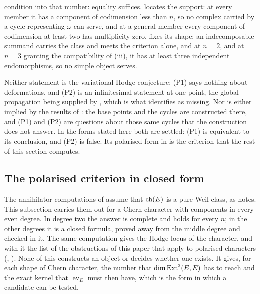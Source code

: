 \begin{remark}
\begin{enumerate}[label=\textup{(P\arabic*)},leftmargin=*]
  condition into that number: equality suffices.  locates
  the support: at every member it has a component of codimension less than
  $n$, so no complex carried by a cycle representing $\omega$ can serve, and
  at a general member every component of codimension at least two has
  multiplicity zero.
   fixes its shape: an indecomposable summand carries the
  class and meets the criterion alone, and at $n=2$, and at $n=3$ granting
  the compatibility of (iii), it has at least three
  independent endomorphisms, so no simple object serves.
\end{enumerate}

Neither statement is the variational Hodge conjecture: (P1) says nothing
about deformations, and (P2) is an infinitesimal statement at one point, the
global propagation being supplied by , which is what
 identifies as missing. Nor is either implied by the
results of : the base points and the cycles are
constructed there, and (P1) and (P2) are questions about those same cycles
that the construction does not answer. In the forms stated here both are
settled: (P1) is equivalent to its conclusion, and (P2) is false. Its
polarised form in  is the criterion that the rest of this
section computes.
\end{remark}

\subsection{The polarised criterion in closed form}

The annihilator computations of  assume that $\operatorname{ch}(E)$
is a pure Weil class, as  notes. This subsection carries
them out for a Chern character with components in every even degree. In
degree two the answer is complete and holds for every $n$; in the other
degrees it is a closed formula, proved away from the middle degree and
checked in it. The same computation gives the Hodge locus of the character,
and with it the list of the obstructions of this paper that apply to
polarised characters (, ).
None of this constructs an object or decides whether one exists. It gives,
for each shape of Chern character, the number that $\dim\operatorname{Ext}^{2}(E,E)$ has
to reach and the exact kernel that $\operatorname{ev}_{E}$ must then have,
which is the form in which a candidate can be tested.

